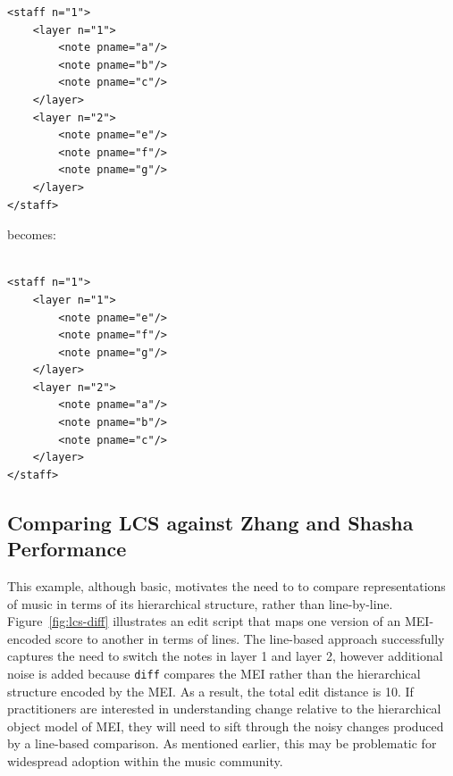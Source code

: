 \documentclass{article}
\newcommand{\code}[1]{\texttt{#1}}
\begin{document}
\begin{verbatim}
<staff n="1"> 
    <layer n="1">
        <note pname="a"/>
        <note pname="b"/>
        <note pname="c"/>
    </layer>
    <layer n="2">
        <note pname="e"/>
        <note pname="f"/>
        <note pname="g"/>
    </layer>
</staff>
\end{verbatim}

becomes:

\begin{verbatim}

<staff n="1">
    <layer n="1">
        <note pname="e"/>
        <note pname="f"/>
        <note pname="g"/>
    </layer>
    <layer n="2">
        <note pname="a"/>
        <note pname="b"/>
        <note pname="c"/>
    </layer>
</staff>
\end{verbatim}


\subsection{Comparing LCS against Zhang and Shasha Performance}
This example, although basic, motivates the need to to compare representations of music in terms of its 
hierarchical structure, rather than line-by-line. Figure~\ref{fig:lcs-diff} illustrates an edit script that maps one
version of an MEI-encoded score to another in terms of lines.
The line-based approach successfully captures the need to switch the
notes in layer 1 and layer 2, however additional noise is added
because \code{diff} compares the MEI rather than the hierarchical
structure encoded by the MEI.  As a result, the total edit distance is
10.  If practitioners are interested in understanding change relative
to the hierarchical object model of MEI, they will need to sift
through the noisy changes produced by a line-based comparison.  As
mentioned earlier, this may be problematic for widespread adoption
within the music community.
\end{document}
